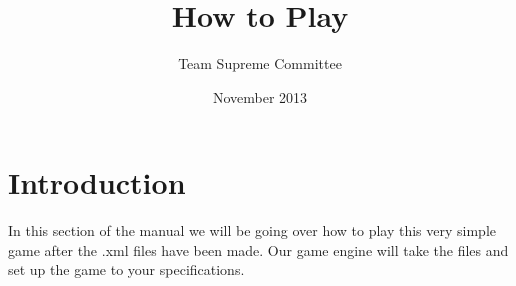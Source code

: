 \documentclass[11pt]{article}
\begin{document}
\title{How to Play}
\author{Team Supreme Committee}
\date{November 2013}
\maketitle


\section{Introduction}

In this section of the manual we will be going over how to play this very simple game after the .xml files have been made. Our game engine will take the files and set up the game to your specifications. 
\end{document}
